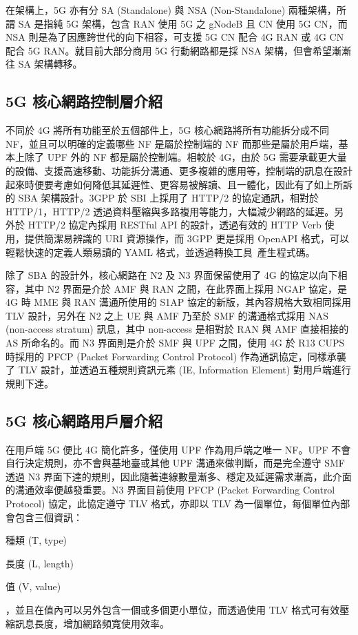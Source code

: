 在架構上，5G 亦有分 SA (Standalone) 與 NSA (Non-Standalone) 兩種架構，所謂 SA 是指純 5G 架構，包含 RAN 使用 5G 之 gNodeB 且 CN 使用 5G CN，而 NSA 則是為了因應跨世代的向下相容，可支援 5G CN 配合 4G RAN 或 4G CN 配合 5G RAN。就目前大部分商用 5G 行動網路都是採 NSA 架構，但會希望漸漸往 SA 架構轉移。

\subsection{5G 核心網路控制層介紹}
\label{subsec:5g_cp_intro}

不同於 4G 將所有功能至於五個部件上，5G 核心網路將所有功能拆分成不同 NF，並且可以明確的定義哪些 NF 是屬於控制端的 NF 而那些是屬於用戶端，基本上除了 UPF 外的 NF 都是屬於控制端。相較於 4G，由於 5G 需要承載更大量的設備、支援高速移動、功能拆分溝通、更多複雜的應用等，控制端的訊息在設計起來時便要考慮如何降低其延遲性、更容易被解讀、且一體化，因此有了如上所訴的 SBA 架構設計。3GPP 於 SBI 上採用了 HTTP/2 的協定通訊，相對於 HTTP/1，HTTP/2 透過資料壓縮與多路複用等能力，大幅減少網路的延遲。另外於 HTTP/2 協定內採用 RESTful API 的設計，透過有效的 HTTP Verb 使用，提供簡潔易辨識的 URI 資源操作，而 3GPP 更是採用 OpenAPI 格式，可以輕鬆快速的定義人類易讀的 YAML 格式，並透過轉換工具~\cite{openapi.generator}產生程式碼。

除了 SBA 的設計外，核心網路在 N2 及 N3 界面保留使用了 4G 的協定以向下相容，其中 N2 界面是介於 AMF 與 RAN 之間，在此界面上採用 NGAP 協定，是 4G 時 MME 與 RAN 溝通所使用的 S1AP 協定的新版，其內容規格大致相同採用 TLV 設計，另外在 N2 之上 UE 與 AMF 乃至於 SMF 的溝通格式採用 NAS (non-access stratum) 訊息，其中 non-access 是相對於 RAN 與 AMF 直接相接的 AS 所命名的。而 N3 界面則是介於 SMF 與 UPF 之間，使用 4G 於 R13 CUPS 時採用的 PFCP (Packet Forwarding Control Protocol) 作為通訊協定，同樣承襲了 TLV 設計，並透過五種規則資訊元素 (IE, Information Element) 對用戶端進行規則下達。

\subsection{5G 核心網路用戶層介紹}
\label{subsec:5g_up_intro}

在用戶端 5G 便比 4G 簡化許多，僅使用 UPF 作為用戶端之唯一 NF。UPF 不會自行決定規則，亦不會與基地臺或其他 UPF 溝通來做判斷，而是完全遵守 SMF 透過 N3 界面下達的規則，因此隨著連線數量漸多、穩定及延遲需求漸高，此介面的溝通效率便越發重要。N3 界面目前使用 PFCP (Packet Forwarding Control Protocol) 協定，此協定遵守 TLV 格式，亦即以 TLV 為一個單位，每個單位內部會包含三個資訊：
\begin{enumerate*}
\item 種類 (T, type)
\item 長度 (L, length)
\item 值 (V, value)
\end{enumerate*}
，並且在值內可以另外包含一個或多個更小單位，而透過使用 TLV 格式可有效壓縮訊息長度，增加網路頻寬使用效率。

